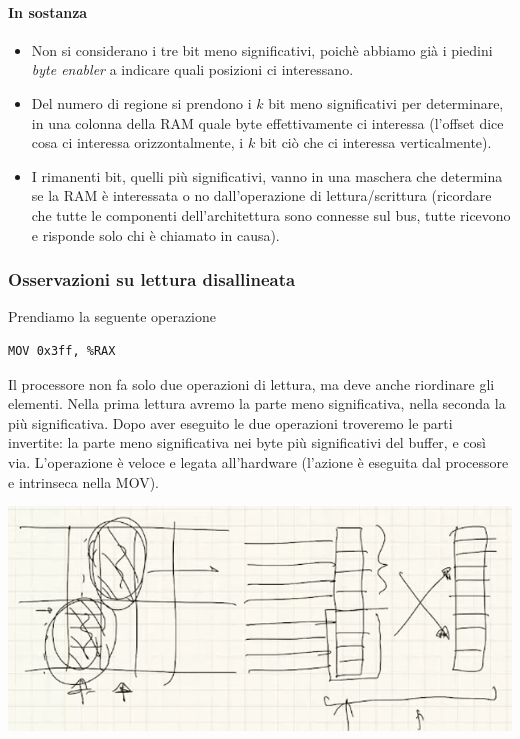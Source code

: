 \documentclass[11pt]{report}
\theoremstyle{definition}
\begin{document}
\paragraph{In sostanza}
\begin{itemize}
	\item Non si considerano i tre bit meno significativi, poichè abbiamo già i piedini \emph{byte enabler} a indicare quali posizioni ci interessano.
	\item Del numero di regione si prendono i $k$ bit meno significativi per determinare, in una colonna della RAM quale byte effettivamente ci interessa (l'offset dice cosa ci interessa orizzontalmente, i $k$ bit ciò che ci interessa verticalmente).
	\item I rimanenti bit, quelli più significativi, vanno in una maschera che determina se la RAM è interessata o no dall'operazione di lettura/scrittura (ricordare che tutte le componenti dell'architettura sono connesse sul bus, tutte ricevono e risponde solo chi è chiamato in causa).
\end{itemize}
\subsubsection{Osservazioni su lettura disallineata}  Prendiamo la seguente operazione
\begin{verbatim}
MOV 0x3ff, %RAX
\end{verbatim}
Il processore non fa solo due operazioni di lettura, ma deve anche riordinare gli elementi. Nella prima lettura avremo la parte meno significativa, nella seconda la più significativa. Dopo aver eseguito le due operazioni troveremo le parti invertite: la parte meno significativa nei byte più significativi del buffer, e così via. L'operazione è veloce e legata all'hardware (l'azione è eseguita dal processore e intrinseca nella MOV).
\begin{center}
\includegraphics[scale=0.90]{img/11.PNG}
\end{center} 
\end{document}
